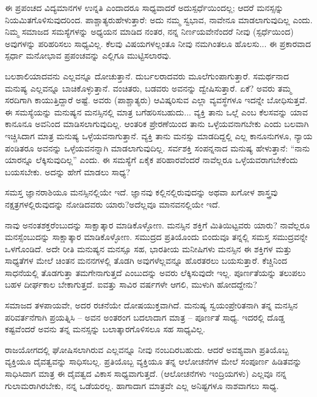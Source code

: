 \vskip 6pt

ಈ ಪ್ರಪಂಚದ ವಿದ್ಯಮಾನಗಳ ಉನ್ನತಿ ಎಂದಾದರೂ ಸಾಧ್ಯವಾದರೆ ಅದು\break ಸ್ಪರ್ಧೆಯಿಂದಲ್ಲ; ಆದರೆ ಮನಸ್ಸನ್ನು ನಿಯಮಿತಗೊಳಿಸುವುದರಿಂದ. ಪಾಶ್ಚಾತ್ಯರು\break ಹೇಳುತ್ತಾರೆ: ಅದು ನಮ್ಮ ಸ್ವಭಾವ, ನಾವೇನೂ ಮಾಡಲಾಗುವುದಿಲ್ಲ ಎಂದು. ನಿಮ್ಮ ಸಮಾಜದ ಸಮಸ್ಯೆಗಳನ್ನು ಅಧ್ಯಯನ ಮಾಡಿದ ನಂತರ, ನನ್ನ ನಿರ್ಣಯವೇನೆಂದರೆ ನೀವು (ಸ್ಪರ್ಧೆಯಿಂದ) ಅವುಗಳನ್ನು ಪರಿಹರಿಸಲು ಸಾಧ್ಯವಿಲ್ಲ. ಕೆಲವು ವಿಷಯಗಳಲ್ಲಂತೂ ನೀವು ನಮಗಿಂತಲೂ ಹೊಲಸು... ಈ ಪ್ರಕಾರವಾದ ಸ್ಪರ್ಧಾ ಮನೋಭಾವ ಪ್ರಪಂಚವನ್ನು ಎಲ್ಲಿಗೂ ಮುಟ್ಟಿಸಲಾರವು.

\vskip 6pt

ಬಲಶಾಲಿಯಾದವನು ಎಲ್ಲವನ್ನೂ ದೋಚುತ್ತಾನೆ. ದುರ್ಬಲರಾದವರು ಮೂಲೆಗುಂಪಾಗುತ್ತಾರೆ. ಸಮರ್ಥನಾದ ಮನುಷ್ಯ ಎಲ್ಲವನ್ನೂ ಬಾಚಿಕೊಳ್ಳುತ್ತಾನೆ. ವಂಚಿತರು, ಬಡವರು ಅವನನ್ನು ದ್ವೇಷಿಸುತ್ತಾರೆ. ಏಕೆ? ಅವರು ತಮ್ಮ ಸರದಿಗಾಗಿ ಕಾಯುತ್ತಿದ್ದಾರೆ ಅಷ್ಟೆ. ಅವರು (ಪಾಶ್ಚಾತ್ಯರು) ಆವಿಷ್ಕರಿಸುವ ಎಲ್ಲಾ ವ್ಯವಸ್ಥೆಗಳೂ ಇದನ್ನೇ ಬೋಧಿಸುತ್ತವೆ. ಈ ಸಮಸ್ಯೆಯನ್ನು ಮನುಷ್ಯನ ಮನಸ್ಸಿನಲ್ಲಿ ಮಾತ್ರ ಬಗೆಹರಿಸಬಹುದು... ವ್ಯಕ್ತಿ ತಾನು ಒಲ್ಲೆ ಎಂಬ ಕೆಲಸವನ್ನು ಯಾವ ಕಾನೂನೂ ಅವನಿಂದ ಮಾಡಿಸಲಾಗುವುದಿಲ್ಲ. ಆಂತರಿಕ ಪ್ರೇರಣೆಯಿಂದ ತಾನು ಒಳ್ಳೆಯವನಾಗಬೇಕು ಎಂದು ಬಲವಾಗಿ ಇಚ್ಚಿಸಿದಾಗ ಮಾತ್ರ ಮನುಷ್ಯ ಒಳ್ಳೆಯವನಾಗುತ್ತಾನೆ. ವ್ಯಕ್ತಿ ತಾನು ಮನಸ್ಸು ಮಾಡದಿದ್ದಲ್ಲಿ ಎಲ್ಲ ಕಾನೂನುಗಳೂ, ನ್ಯಾಯ ಪಂಡಿತರೂ ಅವನನ್ನು ಒಳ್ಳೆಯವನನ್ನಾಗಿ ಮಾಡಲಾಗುವುದಿಲ್ಲ. ಸರ್ವಶಕ್ತಿ ಸಂಪನ್ನನಾದ ಮನುಷ್ಯ ಹೇಳುತ್ತಾನೆ: “ನಾನು ಯಾರನ್ನೂ ಲೆಕ್ಕಿಸುವುದಿಲ್ಲ” ಎಂದು. ಈ ಸಮಸ್ಯೆಗೆ ಏಕೈಕ ಪರಿಹಾರವೆಂದರೆ ನಾವೆಲ್ಲರೂ ಒಳ್ಳೆಯವರಾಗಬೇಕೆಂದು ಬಯಸಬೇಕು. ಅದನ್ನು ಹೇಗೆ ಮಾಡಲು ಸಾಧ್ಯ?

\vskip 6pt

ಸಮಸ್ತ ಜ್ಞಾನರಾಶಿಯೂ ಮನಸ್ಸಿನಲ್ಲಿಯೇ ಇದೆ. ಜ್ಞಾನವು ಕಲ್ಲಿನಲ್ಲಿರುವುದನ್ನು ಅಥವಾ ಖಗೋಳ ಶಾಸ್ತ್ರವು ನಕ್ಷತ್ರಗಳಲ್ಲಿರುವುದನ್ನು ನೋಡಿದವರು ಯಾರು?\break ಅದೆಲ್ಲವೂ ಮಾನವನಲ್ಲಿಯೇ ಇದೆ.

\vskip 6pt

ನಾವು ಅನಂತಶಕ್ತರೆಂಬುದನ್ನು ಸಾಕ್ಷಾತ್ಕಾರ ಮಾಡಿಕೊಳ್ಳೋಣ. ಮನಸ್ಸಿನ ಶಕ್ತಿಗೆ ಮಿತಿಯಿಟ್ಟವರು ಯಾರು? ನಾವೆಲ್ಲರೂ ಮನಸ್ಸೆಂಬುದನ್ನು ಸಾಕ್ಷಾತ್ಕಾರ ಮಾಡಿಕೊಳ್ಳೋಣ. ಸಮುದ್ರದ ಪ್ರತಿಯೊಂದು ಬಿಂದುವೂ ತನ್ನಲ್ಲಿ ಸಮಸ್ತ ಸಮುದ್ರವನ್ನೇ ಒಳಗೊಂಡಿದೆ. ಅದೇ ರೀತಿ ಮನುಷ್ಯನ ಮನಸ್ಸೂ ಸಹ, ಭಾರತೀಯ ಮನೀಷಿಗಳು ಮನಸ್ಸಿನ ಈ ಶಕ್ತಿಗಳ ಮತ್ತು ಸಾಧ್ಯತೆಗಳ ಮೇಲೆ ಚಿಂತನ ಮನನಗಳಲ್ಲಿ ತೊಡಗಿ ಅವುಗಳೆಲ್ಲವನ್ನೂ ಹೊರತರಲು ಬಯಸುತ್ತಾರೆ. ಕೆಚ್ಚಿನಿಂದ ಸಾಧನೆಯಲ್ಲಿ ತೊಡಗುತ್ತಾ ತಮಗೇನಾಗುತ್ತದೆ ಎಂಬುದನ್ನು ಅವರು ಲೆಕ್ಕಿಸುವುದೇ ಇಲ್ಲ. ಪೂರ್ಣತೆಯನ್ನು ತಲುಪಲು ಬಹಳ ದೀರ್ಘಕಾಲ ಬೇಕಾಗುತ್ತದೆ. ಐವತ್ತು ಸಾವಿರ ವರ್ಷಗಳೇ ಆಗಲಿ, ಮುಳುಗಿ ಹೋದದ್ದೇನು?

\vskip 6pt

ಸಮಾಜದ ತಳಪಾಯವೇ, ಅದರ ರಚನೆಯೇ ದೋಷಯುಕ್ತವಾಗಿದೆ. ಮನುಷ್ಯ ಸ್ವಯಂಪ್ರೇರಿತನಾಗಿ ತನ್ನ ಮನಸ್ಸಿನ ಪರಿವರ್ತನೆಗಾಗಿ ಪ್ರಯತ್ನಿಸಿ – ಅವನ ಅಂತರಂಗ ಬದಲಾದಾಗ ಮಾತ್ರ – ಪೂರ್ಣತೆ ಸಾಧ್ಯ. ಇದರಲ್ಲಿ ದೊಡ್ಡ ಕಷ್ಟವೆಂದರೆ ಅವನು ತನ್ನ ಮನಸ್ಸನ್ನು ಬಲಾತ್ಕಾರಗೊಳಿಸಲೂ ಸಹ ಸಾಧ್ಯವಿಲ್ಲ.

\vskip 6pt

ರಾಜಯೋಗದಲ್ಲಿ ಘೋಷಿಸಲಾಗಿರುವ ಎಲ್ಲವನ್ನೂ ನೀವು ನಂಬದಿರಬಹುದು. ಆದರೆ ಅವಶ್ಯವಾಗಿ ಪ್ರತಿಯೊಬ್ಬ ವ್ಯಕ್ತಿಯೂ ದೈವತ್ವವನ್ನು ಸಾಧಿಸಬಲ್ಲ. ಪ್ರತಿಯೊಬ್ಬ ವ್ಯಕ್ತಿಯೂ ತನ್ನ ಆಲೋಚನೆಗಳ ಮೇಲೆ ಸಂಪೂರ್ಣ ಹಿಡಿತವನ್ನು ಸಾಧಿಸಿದಾಗ ಮಾತ್ರ ಈ ದೈವತ್ವದ ವಿಕಾಸ ಸಾಧ್ಯವಾಗುತ್ತದೆ. (ಆಲೋಚನೆಗಳು ಇಂದ್ರಿಯಗಳು) ಎಲ್ಲವೂ ನನ್ನ ಗುಲಾಮರಾಗಿರಬೇಕು, ನನ್ನ ಒಡೆಯರಲ್ಲ. ಹಾಗಾದಾಗ ಮಾತ್ರವೇ ಎಲ್ಲ ಅನಿಷ್ಟಗಳೂ ನಾಶವಾಗಲು ಸಾಧ್ಯ.

